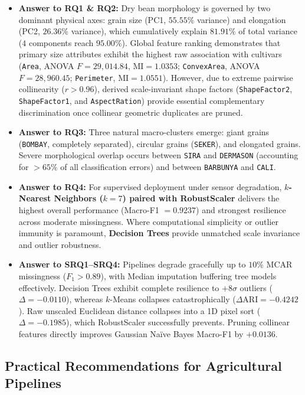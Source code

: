 \documentclass[11pt,a4paper]{article}
\begin{document}
\begin{itemize}[leftmargin=1.5em]
    \item \textbf{Answer to RQ1 \& RQ2:} Dry bean morphology is governed by two dominant physical axes: grain size (PC1, $55.55\%$ variance) and elongation (PC2, $26.36\%$ variance), which cumulatively explain $81.91\%$ of total variance ($4$ components reach $95.00\%$). Global feature ranking demonstrates that primary size attributes exhibit the highest raw association with cultivars (\texttt{Area}, ANOVA $F = 29{,}014.84$, $\text{MI} = 1.0353$; \texttt{ConvexArea}, ANOVA $F = 28{,}960.45$; \texttt{Perimeter}, $\text{MI} = 1.0551$). However, due to extreme pairwise collinearity ($r > 0.96$), derived scale-invariant shape factors (\texttt{ShapeFactor2}, \texttt{ShapeFactor1}, and \texttt{AspectRation}) provide essential complementary discrimination once collinear geometric duplicates are pruned.
    \item \textbf{Answer to RQ3:} Three natural macro-clusters emerge: giant grains (\texttt{BOMBAY}, completely separated), circular grains (\texttt{SEKER}), and elongated grains. Severe morphological overlap occurs between \texttt{SIRA} and \texttt{DERMASON} (accounting for $> 65\%$ of all classification errors) and between \texttt{BARBUNYA} and \texttt{CALI}.
    \item \textbf{Answer to RQ4:} For supervised deployment under sensor degradation, \textbf{$k$-Nearest Neighbors ($k=7$) paired with RobustScaler} delivers the highest overall performance (Macro-F1 $= 0.9237$) and strongest resilience across moderate missingness. Where computational simplicity or outlier immunity is paramount, \textbf{Decision Trees} provide unmatched scale invariance and outlier robustness.
    \item \textbf{Answer to SRQ1--SRQ4:} Pipelines degrade gracefully up to $10\%$ MCAR missingness ($F_1 > 0.89$), with Median imputation buffering tree models effectively. Decision Trees exhibit complete resilience to $+8\sigma$ outliers ($\Delta = -0.0110$), whereas $k$-Means collapses catastrophically ($\Delta \text{ARI} = -0.4242$). Raw unscaled Euclidean distance collapses into a 1D pixel sort ($\Delta = -0.1985$), which RobustScaler successfully prevents. Pruning collinear features directly improves Gaussian Naïve Bayes Macro-F1 by $+0.0136$.
\end{itemize}

\subsection{Practical Recommendations for Agricultural Pipelines}
\label{subsec:recommendations}
\end{document}
